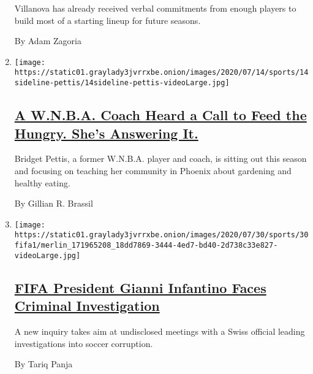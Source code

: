 \begin{enumerate}
  Villanova has already received verbal commitments from enough players
  to build most of a starting lineup for future seasons.

  By Adam Zagoria
\item
  \texttt{[image: https://static01.graylady3jvrrxbe.onion/images/2020/07/14/sports/14sideline-pettis/14sideline-pettis-videoLarge.jpg]}

  \hypertarget{a-wnba-coach-heard-a-call-to-feed-the-hungry-shes-answering-it}{%
  \subsection{\texorpdfstring{\href{/2020/07/30/sports/basketball/wnba-bridget-pettis.html}{A
  W.N.B.A. Coach Heard a Call to Feed the Hungry. She's Answering
  It.}}{A W.N.B.A. Coach Heard a Call to Feed the Hungry. She's Answering It.}}\label{a-wnba-coach-heard-a-call-to-feed-the-hungry-shes-answering-it}}

  Bridget Pettis, a former W.N.B.A. player and coach, is sitting out
  this season and focusing on teaching her community in Phoenix about
  gardening and healthy eating.

  By Gillian R. Brassil
\item
  \texttt{[image: https://static01.graylady3jvrrxbe.onion/images/2020/07/30/sports/30fifa1/merlin\_171965208\_18dd7869-3444-4ed7-bd40-2d738c33e827-videoLarge.jpg]}

  \hypertarget{fifa-president-gianni-infantino-faces-criminal-investigation}{%
  \subsection{\texorpdfstring{\href{/2020/07/30/sports/soccer/fifa-gianni-infantino-investigation.html}{FIFA
  President Gianni Infantino Faces Criminal
  Investigation}}{FIFA President Gianni Infantino Faces Criminal Investigation}}\label{fifa-president-gianni-infantino-faces-criminal-investigation}}

  A new inquiry takes aim at undisclosed meetings with a Swiss official
  leading investigations into soccer corruption.

  By Tariq Panja
\end{enumerate}

